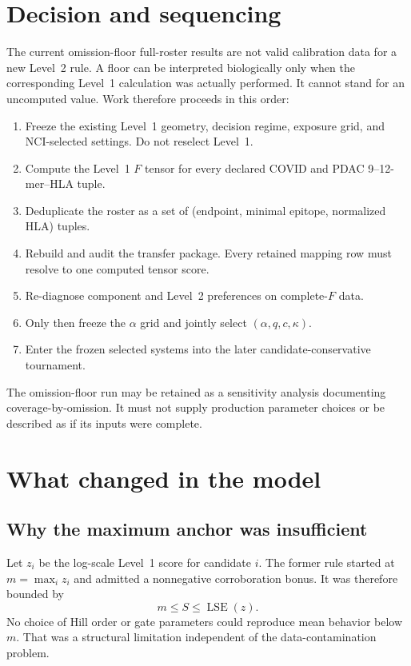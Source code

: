 \documentclass[11pt]{article}
\newcommand{\LSE}{\operatorname{LSE}}
\begin{document}
\section{Decision and sequencing}

The current omission-floor full-roster results are not valid calibration data
for a new Level~2 rule. A floor can be interpreted biologically only when the
corresponding Level~1 calculation was actually performed. It cannot stand for
an uncomputed value. Work therefore proceeds in this order:

\begin{enumerate}
  \item Freeze the existing Level~1 geometry, decision regime, exposure grid,
  and NCI-selected settings. Do not reselect Level~1.
  \item Compute the Level~1 $F$ tensor for every declared COVID and PDAC
  9--12-mer--HLA tuple.
  \item Deduplicate the roster as a set of
  (endpoint, minimal epitope, normalized HLA) tuples.
  \item Rebuild and audit the transfer package. Every retained mapping row must
  resolve to one computed tensor score.
  \item Re-diagnose component and Level~2 preferences on complete-$F$ data.
  \item Only then freeze the $\alpha$ grid and jointly select
  $(\alpha,q,c,\kappa)$.
  \item Enter the frozen selected systems into the later
  candidate-conservative tournament.
\end{enumerate}

The omission-floor run may be retained as a sensitivity analysis documenting
coverage-by-omission. It must not supply production parameter choices or be
described as if its inputs were complete.

\section{What changed in the model}

\subsection{Why the maximum anchor was insufficient}

Let $z_i$ be the log-scale Level~1 score for candidate $i$. The former rule
started at $m=\max_i z_i$ and admitted a nonnegative corroboration bonus. It
was therefore bounded by
\[
m\leq S\leq \LSE(z).
\]
No choice of Hill order or gate parameters could reproduce mean behavior below
$m$. That was a structural limitation independent of the data-contamination
problem.
\end{document}
